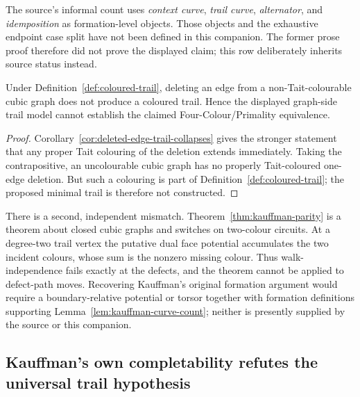 The source's informal count uses \emph{context curve}, \emph{trail curve},
\emph{alternator}, and \emph{idemposition} as formation-level objects.
Those objects and the exhaustive endpoint case split have not been defined
in this companion.  The former prose proof therefore did not prove the
displayed claim; this row deliberately inherits source status instead.

\begin{proposition}
\label{thm:kauffman-primality-equivalence}
Under Definition~\ref{def:coloured-trail}, deleting an edge from a
non-Tait-colourable cubic graph does not produce a coloured trail.  Hence the
displayed graph-side trail model cannot establish the claimed
Four-Colour/Primality equivalence.
\end{proposition}

\begin{proof}
Corollary~\ref{cor:deleted-edge-trail-collapses} gives the stronger
statement that any proper Tait colouring of the deletion extends immediately.
Taking the contrapositive, an uncolourable cubic graph has no properly
Tait-coloured one-edge deletion.  But such a colouring is part of
Definition~\ref{def:coloured-trail}; the proposed minimal trail is therefore
not constructed.
\end{proof}

There is a second, independent mismatch.  Theorem~\ref{thm:kauffman-parity}
is a theorem about closed cubic graphs and switches on two-colour circuits.
At a degree-two trail vertex the putative dual face potential accumulates
the two incident colours, whose sum is the nonzero missing colour.  Thus
walk-independence fails exactly at the defects, and the theorem cannot be
applied to defect-path moves.  Recovering Kauffman's original formation
argument would require a boundary-relative potential or torsor together with
formation definitions supporting Lemma~\ref{lem:kauffman-curve-count};
neither is presently supplied by the source or this companion.

\subsection{Kauffman's own completability refutes the universal trail hypothesis}
\label{subsec:kauffman-completability-refuted}

